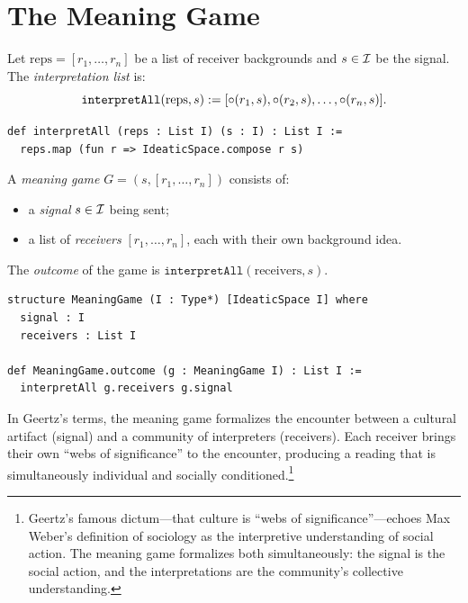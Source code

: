 \section{The Meaning Game}
\label{sec:ch20-defs}

\begin{definition}
\label{def:interpretAll}
Let $\text{reps} = [r_1, \ldots, r_n]$ be a list of receiver backgrounds
and $s \in \mathcal{I}$ be the signal.  The \emph{interpretation list} is:
\[
  \texttt{interpretAll}(\text{reps}, s) :=
  [\circ(r_1, s), \circ(r_2, s), \ldots, \circ(r_n, s)].
\]
\end{definition}

\begin{lstlisting}[caption={interpretAll in Lean}]
def interpretAll (reps : List I) (s : I) : List I :=
  reps.map (fun r => IdeaticSpace.compose r s)
\end{lstlisting}

\begin{definition}
\label{def:MeaningGame}
A \emph{meaning game} $G = (s, [r_1, \ldots, r_n])$ consists of:
\begin{itemize}
  \item a \emph{signal} $s \in \mathcal{I}$ being sent;
  \item a list of \emph{receivers} $[r_1, \ldots, r_n]$, each with their
    own background idea.
\end{itemize}
The \emph{outcome} of the game is $\texttt{interpretAll}(\text{receivers}, s)$.
\end{definition}

\begin{lstlisting}[caption={Meaning game structure in Lean}]
structure MeaningGame (I : Type*) [IdeaticSpace I] where
  signal : I
  receivers : List I

def MeaningGame.outcome (g : MeaningGame I) : List I :=
  interpretAll g.receivers g.signal
\end{lstlisting}

In Geertz's terms, the meaning game formalizes the encounter between a
cultural artifact (signal) and a community of interpreters (receivers).
Each receiver brings their own ``webs of significance'' to the encounter,
producing a reading that is simultaneously individual and socially
conditioned.\footnote{Geertz's famous dictum---that culture is ``webs of
significance''---echoes Max Weber's definition of sociology as the
interpretive understanding of social action.  The meaning game formalizes
both simultaneously: the signal is the social action, and the
interpretations are the community's collective understanding.}

